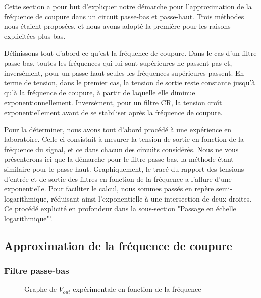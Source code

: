 

Cette section a pour but d'expliquer notre démarche pour l'approximation de la fréquence de coupure
dans un circuit passe-bas et passe-haut. Trois méthodes nous étaient proposées, et nous avons adopté
la première pour les raisons explicitées plus bas.

Définissons tout d'abord ce qu'est la fréquence de coupure. Dans le cas d'un filtre passe-bas, toutes les fréquences qui
lui sont supérieures ne passent pas et, inversément, pour un passe-haut seules les fréquences supérieures passent.
En terme de tension, dans le premier cas, la tension de sortie reste constante jusqu'à qu'à la fréquence de coupure,
à partir de laquelle elle diminue exponentionnellement. Inversément, pour un filtre CR, la tension croît
exponentiellement avant de se stabiliser après la fréquence de coupure.

Pour la déterminer, nous avons tout d'abord procédé à une expérience en laboratoire.
Celle-ci consistait à mesurer la tension de sortie en fonction de la fréquence du signal, et ce dans
chacun des circuits considérés. Nous ne vous présenterons ici que la démarche pour le filtre passe-bas, 
la méthode étant similaire pour le passe-haut.
Graphiquement, le tracé du rapport des tensions d'entrée et de sortie des filtres en fonction de la
fréquence a l'allure d'une exponentielle. Pour faciliter le calcul, nous sommes passés en repère
semi-logarithmique, réduisant ainsi l'exponentielle à une intersection de deux droites. Ce procédé
explicité en profondeur dans la sous-section "Passage en échelle logarithmique"'.

\subsection{Approximation de la fréquence de coupure}

\subsubsection{Filtre passe-bas}

\begin{figure}[ht!]
\centering
{}
\caption{Graphe de $V_{out}$ expérimentale en fonction de la fréquence}
\label{lwp_ratio}
\end{figure}



